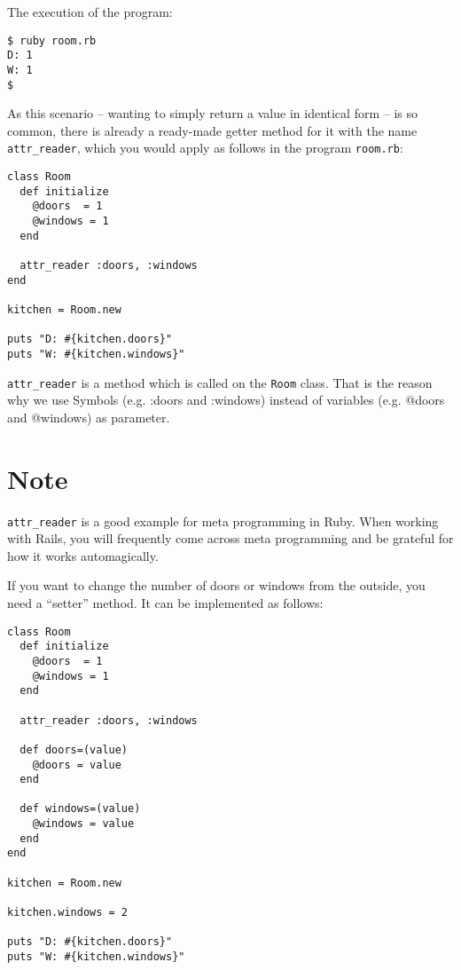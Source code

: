 \documentclass[a4paper]{book}
\begin{document}
The execution of the program:

\begin{shaded}\begin{verbatim}
$ ruby room.rb
D: 1
W: 1
$
\end{verbatim}\end{shaded}

As this scenario -- wanting to simply return a value in identical form -- is so common, there is already a ready-made getter method for it with the name \texttt{attr\_reader}, which you would apply as follows in the program \texttt{room.rb}:

\begin{shaded}\begin{verbatim}
class Room
  def initialize
    @doors  = 1
    @windows = 1
  end

  attr_reader :doors, :windows
end

kitchen = Room.new

puts "D: #{kitchen.doors}"
puts "W: #{kitchen.windows}"
\end{verbatim}\end{shaded}

\texttt{attr\_reader} is a method which is called on the \texttt{Room} class. That is the reason why we use Symbols (e.g. :doors and :windows) instead of variables (e.g. @doors and @windows) as parameter.

\section{Note}\label{note-7}

\texttt{attr\_reader} is a good example for meta programming in Ruby. When working with Rails, you will frequently come across meta programming and be grateful for how it works automagically.

If you want to change the number of doors or windows from the outside, you need a “setter” method. It can be implemented as follows:

\begin{shaded}\begin{verbatim}
class Room
  def initialize
    @doors  = 1
    @windows = 1
  end

  attr_reader :doors, :windows

  def doors=(value)
    @doors = value
  end

  def windows=(value)
    @windows = value
  end
end

kitchen = Room.new

kitchen.windows = 2

puts "D: #{kitchen.doors}"
puts "W: #{kitchen.windows}"
\end{verbatim}\end{shaded}
\end{document}
